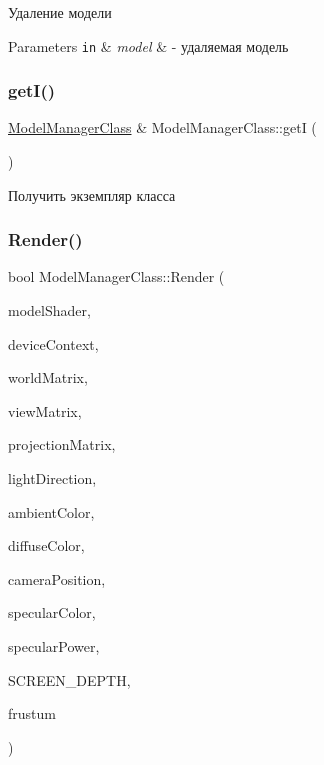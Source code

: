 Удаление модели 


\begin{DoxyParams}[1]{Parameters}
\mbox{\tt in}  & {\em model} & -\/ удаляемая модель \\
\hline
\end{DoxyParams}
\mbox{\label{class_model_manager_class_af547c3196870450233785417d3380b03}} 
\subsubsection{\texorpdfstring{get\+I()}{getI()}}
{\footnotesize\ttfamily \hyperlink{class_model_manager_class}{Model\+Manager\+Class} \& Model\+Manager\+Class\+::getI (\begin{DoxyParamCaption}{ }\end{DoxyParamCaption})\hspace{0.3cm}{\ttfamily [static]}}



Получить экземпляр класса 

\mbox{\label{class_model_manager_class_adb100d82bc2f2aff2eaab4a453c5b0bf}} 
\subsubsection{\texorpdfstring{Render()}{Render()}}
{\footnotesize\ttfamily bool Model\+Manager\+Class\+::\+Render (\begin{DoxyParamCaption}\item[{\hyperlink{class_model_shader_class}{Model\+Shader\+Class} $\ast$}]{model\+Shader,  }\item[{I\+D3\+D11\+Device\+Context $\ast$}]{device\+Context,  }\item[{D3\+D\+X\+M\+A\+T\+R\+IX}]{world\+Matrix,  }\item[{D3\+D\+X\+M\+A\+T\+R\+IX}]{view\+Matrix,  }\item[{D3\+D\+X\+M\+A\+T\+R\+IX}]{projection\+Matrix,  }\item[{D3\+D\+X\+V\+E\+C\+T\+O\+R3}]{light\+Direction,  }\item[{D3\+D\+X\+V\+E\+C\+T\+O\+R4}]{ambient\+Color,  }\item[{D3\+D\+X\+V\+E\+C\+T\+O\+R4}]{diffuse\+Color,  }\item[{D3\+D\+X\+V\+E\+C\+T\+O\+R3}]{camera\+Position,  }\item[{D3\+D\+X\+V\+E\+C\+T\+O\+R4}]{specular\+Color,  }\item[{float}]{specular\+Power,  }\item[{float}]{S\+C\+R\+E\+E\+N\+\_\+\+D\+E\+P\+TH,  }\item[{\hyperlink{class_frustum_class}{Frustum\+Class} $\ast$}]{frustum }\end{DoxyParamCaption})}

